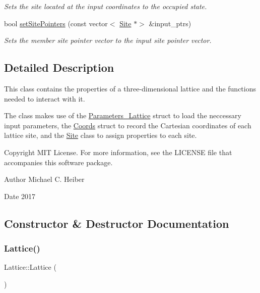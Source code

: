 \begin{DoxyCompactItemize}
\begin{DoxyCompactList}\small\item\em Sets the site located at the input coordinates to the occupied state. \end{DoxyCompactList}\item 
bool \hyperlink{class_lattice_aaa16f46daaf157c155f0e9b378a07b5d}{set\+Site\+Pointers} (const vector$<$ \hyperlink{class_site}{Site} $\ast$$>$ \&input\+\_\+ptrs)
\begin{DoxyCompactList}\small\item\em Sets the member site pointer vector to the input site pointer vector. \end{DoxyCompactList}\end{DoxyCompactItemize}


\subsection{Detailed Description}
This class contains the properties of a three-\/dimensional lattice and the functions needed to interact with it. 

The class makes use of the \hyperlink{struct_parameters___lattice}{Parameters\+\_\+\+Lattice} struct to load the neccessary input parameters, the \hyperlink{struct_coords}{Coords} struct to record the Cartesian coordinates of each lattice site, and the \hyperlink{class_site}{Site} class to assign properties to each site. \begin{DoxyCopyright}{Copyright}
M\+IT License. For more information, see the L\+I\+C\+E\+N\+SE file that accompanies this software package. 
\end{DoxyCopyright}
\begin{DoxyAuthor}{Author}
Michael C. Heiber 
\end{DoxyAuthor}
\begin{DoxyDate}{Date}
2017 
\end{DoxyDate}


\subsection{Constructor \& Destructor Documentation}
\mbox{\label{class_lattice_a70a5cebc3c0c5a0f609be0592e7cc117}} 
\subsubsection{\texorpdfstring{Lattice()}{Lattice()}}
{\footnotesize\ttfamily Lattice\+::\+Lattice (\begin{DoxyParamCaption}{ }\end{DoxyParamCaption})}



